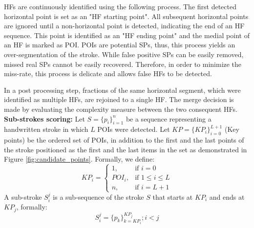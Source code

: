 \documentclass[10pt, conference, compsocconf]{IEEEtran}
\begin{document}
HFs are continuously identified using the following process.
The first detected horizontal point is set as an "HF starting point". 
All subsequent horizontal points are ignored until a non-horizontal point is detected, indicating the end of an HF sequence. 
This point is identified as an "HF ending point" and the medial point of an HF is marked as POI. 
POIs are potential SPs, thus, this process yields an over-segmentation of the stroke. 
While false positive SPs can be easily removed, missed real SPs cannot be easily recovered. 
Therefore, in order to minimize the miss-rate, this process is delicate and allows false HFs to be detected.

In a post processing step, fractions of the same horizontal segment, which were identified as multiple HFs, are rejoined to a single HF. 
The merge decision is made by evaluating the complexity measure between the two consequent HFs.\\

\textbf{Sub-strokes scoring:}
Let $S=\{p_{i}\}_{i=1}^{n}$ be a sequence representing a handwritten stroke in which $L$ POIs were detected. 
Let $KP=\{KP_{i}\}_{i=0}^{L+1}$ (Key points) be the ordered set of POIs, in addition to the first and the last points of the stroke positioned as the first and the last items in the set as demonstrated in Figure \ref{fig:candidate_points}.
Formally, we define: 
\begin{equation}
KP_{i} =\begin{cases}        1		, & \mbox{if } i=0 \\
							   POI_{i}	, & \mbox{if } 1\leq i \leq L \\
							   n    , & \mbox{if } i=L+1 
			\end{cases}				
\end{equation}
A sub-stroke $S_{i}^{j}$ is a sub-sequence of the stroke $S$ that starts at $KP_{i}$ and ends at $KP_{j}$, formally:
\begin{equation}
S_{i}^{j}=\{p_{k}\}_{k=KP_{i}}^{KP_{j}}; i<j
\label{eq:substroke_definition}
\end{equation}
\end{document}
